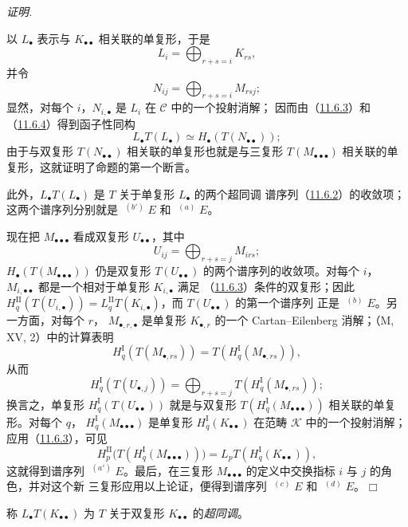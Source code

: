 \documentclass[UTF8,fontset=none,11pt,oneside,openany]{ctexbook}
\providecommand{\square}{\mdlgwhtsquare}
\newenvironment{proof}{%
  \par\smallskip\noindent\textit{证明.}\ %
}{\hfill$\square$\par}
\begin{document}
\begin{proof}
以 $L_\bullet$ 表示与 $K_{\bullet\bullet}$ 相关联的单复形，于是
\[
L_i=\bigoplus_{r+s=i}K_{rs},
\]
并令
\[
N_{ij}=\bigoplus_{r+s=i}M_{rsj};
\]
显然，对每个 $i$，$N_{i,\bullet}$ 是 $L_i$ 在 $\mathcal C$ 中的一个投射消解；
因而由（\hyperref[0.11.6.3-fr]{11.6.3}）和
（\hyperref[0.11.6.4-fr]{11.6.4}）得到函子性同构
\[
L_\bullet T(L_\bullet)\simeq H_\bullet(T(N_{\bullet\bullet}));
\]
由于与双复形 $T(N_{\bullet\bullet})$ 相关联的单复形也就是与三复形
$T(M_{\bullet\bullet\bullet})$ 相关联的单复形，这就证明了命题的第一个断言。

此外，$L_\bullet T(L_\bullet)$ 是 $T$ 关于单复形 $L_\bullet$ 的两个超同调
谱序列（\hyperref[0.11.6.2-fr]{11.6.2}）的收敛项；这两个谱序列分别就是
$\mathop{}^{(b')}E$ 和 $\mathop{}^{(a)}E$。

现在把 $M_{\bullet\bullet\bullet}$ 看成双复形 $U_{\bullet\bullet}$，其中
\[
U_{ij}=\bigoplus_{r+s=j}M_{irs};
\]
$H_\bullet(T(M_{\bullet\bullet\bullet}))$ 仍是双复形
$T(U_{\bullet\bullet})$ 的两个谱序列的收敛项。对每个 $i$，
$M_{i,\bullet\bullet}$ 都是一个相对于单复形 $K_{i,\bullet}$ 满足
（\hyperref[0.11.6.3-fr]{11.6.3}）条件的双复形；因此
$H_q^{\mathrm{II}}(T(U_{i,\bullet}))=
L_q^{\mathrm{II}}T(K_{i,\bullet})$，而 $T(U_{\bullet\bullet})$ 的第一个谱序列
正是 $\mathop{}^{(b)}E$。另一方面，对每个 $r$，
$M_{\bullet,r,\bullet}$ 是单复形 $K_{\bullet,r}$ 的一个 Cartan--Eilenberg
消解；（M, XV, 2）中的计算表明
\[
H_q^{\mathrm I}(T(M_{\bullet,rs}))
=T(H_q^{\mathrm I}(M_{\bullet,rs})),
\]
从而
\[
H_q^{\mathrm I}(T(U_{\bullet,j}))
=\bigoplus_{r+s=j}T(H_q^{\mathrm I}(M_{\bullet,rs}));
\]
换言之，单复形 $H_q^{\mathrm I}(T(U_{\bullet\bullet}))$ 就是与双复形
$T(H_q^{\mathrm I}(M_{\bullet\bullet\bullet}))$ 相关联的单复形。对每个 $q$，
$H_q^{\mathrm I}(M_{\bullet\bullet\bullet})$ 是单复形
$H_q^{\mathrm I}(K_{\bullet\bullet})$ 在范畴 $\mathcal K$ 中的一个投射消解；
应用（\hyperref[0.11.6.3-fr]{11.6.3}），可见
\[
H_p^{\mathrm{II}}
\bigl(T(H_q^{\mathrm I}(M_{\bullet\bullet\bullet}))\bigr)
=L_pT(H_q^{\mathrm I}(K_{\bullet\bullet})),
\]
这就得到谱序列 $\mathop{}^{(a')}E$。最后，在三复形
$M_{\bullet\bullet\bullet}$ 的定义中交换指标 $i$ 与 $j$ 的角色，并对这个新
三复形应用以上论证，便得到谱序列 $\mathop{}^{(c)}E$ 和
$\mathop{}^{(d)}E$。
\end{proof}

称 $L_\bullet T(K_{\bullet\bullet})$ 为 $T$ 关于双复形
$K_{\bullet\bullet}$ 的\emph{超同调}。
\end{document}
